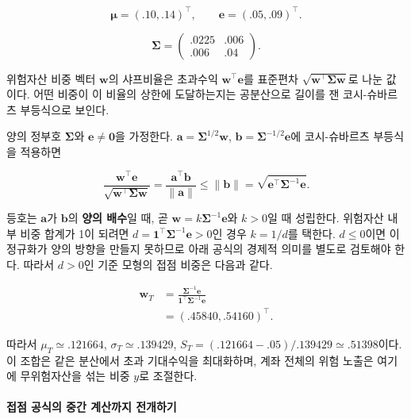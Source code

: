 \documentclass[11pt,a4paper]{article}
\begin{document}
\[
\boldsymbol{\mu}=(.10,.14)^\top,\qquad
\boldsymbol{e}=(.05,.09)^\top.
\]

\[
\boldsymbol{\Sigma}=
\begin{pmatrix}.0225&.006\\.006&.04\end{pmatrix}.
\]

위험자산 비중 벡터 $\boldsymbol{w}$의 샤프비율은 초과수익 $\boldsymbol{w}^\top\boldsymbol{e}$를 표준편차 $\sqrt{\boldsymbol{w}^\top\boldsymbol{\Sigma}\boldsymbol{w}}$로 나눈 값이다. 어떤 비중이 이 비율의 상한에 도달하는지는 공분산으로 길이를 잰 코시-슈바르츠 부등식으로 보인다.
\par

양의 정부호 $\boldsymbol\Sigma$와 $\boldsymbol e\ne\mathbf0$을 가정한다. $\mathbf a=\boldsymbol\Sigma^{1/2}\boldsymbol w$, $\mathbf b=\boldsymbol\Sigma^{-1/2}\boldsymbol e$에 코시-슈바르츠 부등식을 적용하면
\par

\[
\frac{\boldsymbol w^\top\boldsymbol e}
{\sqrt{\boldsymbol w^\top\boldsymbol\Sigma\boldsymbol w}}
=\frac{\mathbf a^\top\mathbf b}{\|\mathbf a\|}
\le\|\mathbf b\|
=\sqrt{\boldsymbol e^\top\boldsymbol\Sigma^{-1}\boldsymbol e}.
\]

등호는 $\mathbf a$가 $\mathbf b$의 \textbf{양의 배수}일 때, 곧 $\boldsymbol w=k\boldsymbol\Sigma^{-1}\boldsymbol e$와 $k>0$일 때 성립한다. 위험자산 내부 비중 합계가 1이 되려면 $d=\boldsymbol1^\top\boldsymbol\Sigma^{-1}\boldsymbol e>0$인 경우 $k=1/d$를 택한다. $d\le0$이면 이 정규화가 양의 방향을 만들지 못하므로 아래 공식의 경제적 의미를 별도로 검토해야 한다. 따라서 $d>0$인 기준 모형의 접점 비중은 다음과 같다.
\par

\[
\begin{aligned}
\boldsymbol{w}_T
&=\frac{\boldsymbol{\Sigma}^{-1}\boldsymbol{e}}
{\boldsymbol{1}^{\top}\boldsymbol{\Sigma}^{-1}\boldsymbol{e}}\\
&=(.45840,.54160)^\top.
\end{aligned}
\]

따라서 $\mu_T\simeq.121664$, $\sigma_T\simeq.139429$, $S_T=(.121664-.05)/.139429\simeq\mathbf{.51398}$이다. 이 조합은 같은 분산에서 초과 기대수익을 최대화하며, 계좌 전체의 위험 노출은 여기에 무위험자산을 섞는 비중 $y$로 조절한다.
\par

\paragraph{접점 공식의 중간 계산까지 전개하기}
\end{document}
